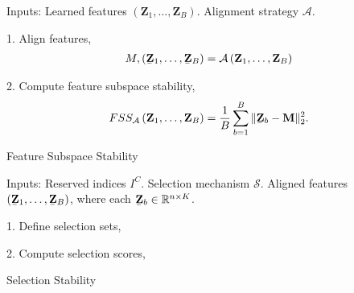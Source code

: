 \begin{algorithm}[H]
  \SetAlgoLined
  Inputs: Learned features $\left(\mathbf{Z}_{1}, \dots, \mathbf{Z}_{B}\right)$.
  Alignment strategy $\mathcal{A}$.

  1. Align features,
  \begin{align*}
    M, \left(\underaccent{\bar}{\mathbf{Z}}_{1}, \dots, \underaccent{\bar}{\mathbf{Z}}_{B}\right) = \mathcal{A}\left(\mathbf{Z}_{1}, \dots, \mathbf{Z}_{B}\right)
  \end{align*}

  2. Compute feature subspace stability,
  \begin{align*}
    FSS_{\mathcal{A}}\left(\mathbf{Z}_{1}, \dots, \mathbf{Z}_{B}\right) = \frac{1}{B} \sum_{b = 1}^{B} \|\underaccent{\bar}{\mathbf{Z}}_{b} - \mathbf{M}\|^{2}_{2}.
  \end{align*}
  \caption{Feature Subspace Stability}
  \label{alg:fss}
\end{algorithm}

\begin{algorithm}[H]
  \SetAlgoLined
  Inputs: Reserved indices $I^{C}$. Selection mechanism $\mathcal{S}$. Aligned
  features $\left(\underaccent{\bar}{\mathbf{Z}}_{1}, \dots,
  \underaccent{\bar}{\mathbf{Z}}_{B}\right)$, where each
  $\underaccent{\bar}{\mathbf{Z}}_{b} \in \reals^{n \times K}$.

  1. Define selection sets,


  2. Compute selection scores,

  \caption{Selection Stability}
  \label{alg:selection}
\end{algorithm}
